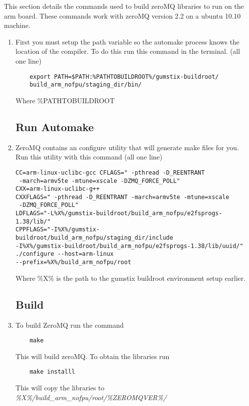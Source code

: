 This section details the commands used to build zeroMQ libraries to run on the arm board. These commands work with zeroMQ version 2.2 on a ubuntu 10.10 machine. 

\begin{enumerate}
	\subsection{Setup path variable}
	\item First you must setup the path variable so the automake process knows the location of the compiler. To do this run this command in the terminal. (all one line)
 \begin{verbatim}
	export PATH=$PATH:%PATHTOBUILDROOT%/gumstix-buildroot/
	build_arm_nofpu/staging_dir/bin/
\end{verbatim}
	Where \%PATHTOBUILDROOT%

	\subsection{Run Automake}
	\item ZeroMQ contains an configure utility that will generate make files for you. Run this utility with this command (all one line)
\begin{verbatim}
CC=arm-linux-uclibc-gcc CFLAGS=" -pthread -D_REENTRANT
 -march=armv5te -mtune=xscale -DZMQ_FORCE_POLL" 
CXX=arm-linux-uclibc-g++ 
CXXFLAGS=" -pthread -D_REENTRANT -march=armv5te -mtune=xscale
 -DZMQ_FORCE_POLL"
LDFLAGS="-L%X%/gumstix-buildroot/build_arm_nofpu/e2fsprogs-1.38/lib/"
CPPFLAGS="-I%X%/gumstix-buildroot/build_arm_nofpu/staging_dir/include 
-I%X%/gumstix-buildroot/build_arm_nofpu/e2fsprogs-1.38/lib/uuid/"
./configure --host=arm-linux 
--prefix=%X%/build_arm_nofpu/root
\end{verbatim}
	Where \%X\% is the path to the gumstix buildroot environment setup earlier.

	\subsection{Build}
	\item To build ZeroMQ run the command
\begin{verbatim}
	make
\end{verbatim}
	This will build zeroMQ. To obtain the libraries run
\begin{verbatim}
	make installl
\end{verbatim}
	This will copy the libraries to \emph{\%X\%/build\_arm\_nofpu/root/\%ZEROMQVER\%/}
\end{enumerate}







